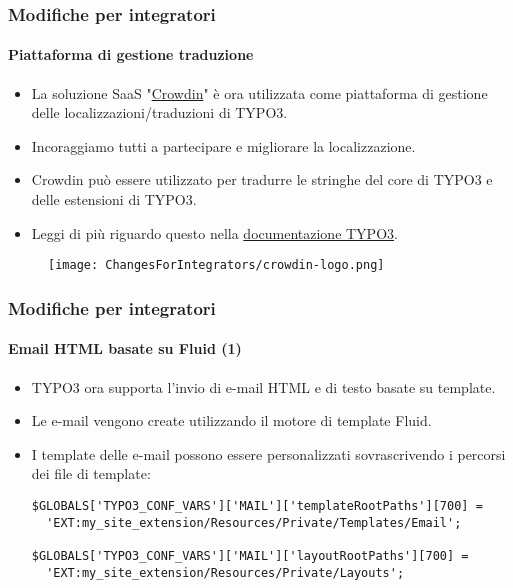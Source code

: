 
\begin{frame}[fragile]
	\frametitle{Modifiche per integratori}
	\framesubtitle{Piattaforma di gestione traduzione}

	\begin{itemize}
		\item La soluzione SaaS "\href{https://crowdin.com/}{Crowdin}" è ora utilizzata come piattaforma
			di gestione delle localizzazioni/traduzioni di TYPO3.
		\item Incoraggiamo tutti a partecipare e migliorare la localizzazione.
		\item Crowdin può essere utilizzato per tradurre le stringhe del core di TYPO3
			e delle estensioni di TYPO3.
		\item Leggi di più riguardo questo nella
			\href{https://docs.typo3.org/m/typo3/reference-coreapi/master/en-us/ApiOverview/Internationalization/TranslationServer/Crowdin.html}{documentazione TYPO3}.
	\end{itemize}

	\begin{figure}
		\texttt{[image: ChangesForIntegrators/crowdin-logo.png]}
	\end{figure}

\end{frame}


\begin{frame}[fragile]
	\frametitle{Modifiche per integratori}
	\framesubtitle{Email HTML basate su Fluid (1)}

	\lstset{basicstyle=\smaller\ttfamily}

	\begin{itemize}
		\item TYPO3 ora supporta l'invio di e-mail HTML e di testo basate su template.
		\item Le e-mail vengono create utilizzando il motore di template Fluid.
		\item I template delle e-mail possono essere personalizzati sovrascrivendo i percorsi dei file di template:

\vspace{-0.4cm}
\begin{lstlisting}
$GLOBALS['TYPO3_CONF_VARS']['MAIL']['templateRootPaths'][700] =
  'EXT:my_site_extension/Resources/Private/Templates/Email';

$GLOBALS['TYPO3_CONF_VARS']['MAIL']['layoutRootPaths'][700] =
  'EXT:my_site_extension/Resources/Private/Layouts';
\end{lstlisting}

	\end{itemize}

\end{frame}

